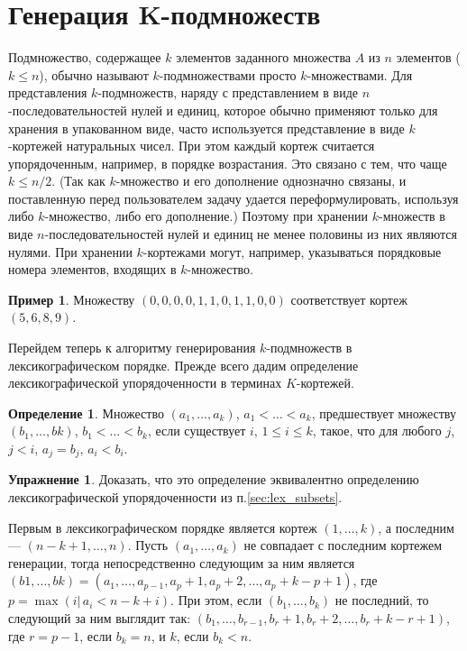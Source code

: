 \documentclass[12pt,a4paper]{article}
\theoremstyle{plain}
\theoremstyle{definition}
\newtheorem{definition}{Определение}
\newtheorem*{task}{Упражнение}
\newtheorem*{example}{Пример}
\theoremstyle{remark}
\begin{document}
\section{Генерация K-подмножеств}

Подмножество, содержащее $k$ элементов заданного множества $A$ из $n$ элементов ($k\le n$), обычно называют $k$-подмножествами просто $k$-множествами. Для представления $k$-подмножеств, наряду с представлением в виде $n$-последовательностей нулей и единиц, которое обычно применяют только для хранения в упакованном виде, часто используется представление в виде $k$-кортежей натуральных чисел. При этом каждый кортеж считается упорядоченным, например, в порядке возрастания. Это связано с тем, что чаще $k\le n/2$. (Так как $k$-множество и его дополнение однозначно связаны, и поставленную перед пользователем задачу удается переформулировать, используя либо $k$-множество, либо его дополнение.) Поэтому при хранении $k$-множеств в виде $n$-последовательностей нулей и единиц не менее половины из них являются нулями. При хранении $k$-кортежами могут, например, указываться порядковые номера элементов, входящих в $k$-множество. 

\begin{example}
Множеству $(0,0,0,0,1,1,0,1,1,0,0)$ соответствует кортеж $(5,6,8,9)$.
\end{example}

Перейдем теперь к алгоритму генерирования $k$-подмножеств в лексикографическом порядке. Прежде всего дадим определение лексикографической упорядоченности в терминах $K$-кортежей.

\begin{definition}
Множество $(a_1,\ldots,a_k)$, $a_1<\ldots<a_k$, предшествует множеству $(b_1,\ldots,bk)$, $b_1<\ldots<b_k$, если существует $i$, $1\le i\le k$, такое, что для любого $j$, $j<i$, $a_j=b_j$, $a_i<b_i$.
\end{definition}

\begin{task}
Доказать, что это определение эквивалентно определению лексикографической упорядоченности из п.\ref{sec:lex_subsets}.
\end{task}

Первым в лексикографическом порядке является кортеж $(1,\ldots,k)$, а последним --- $(n-k+1,\ldots,n)$. Пусть $(a_1,\ldots,a_k)$ не совпадает с последним кортежем генерации, тогда непосредственно следующим за ним является $(b1,\ldots,bk) = (a_1,\ldots,a_{p-1},a_p+1,a_p+2,\ldots,a_p+k-p+1)$, где $p=\max(i \vert\, a_i<n-k+i)$. При этом, если $(b_1,\ldots,b_k)$ не последний, то следующий за ним выглядит так: $(b_1,\ldots,b_{r-1},b_r+1,b_r+2,\ldots,b_r+k-r+1)$, где $r=p-1$, если $b_k=n$, и $k$, если $b_k<n$.
\end{document}
